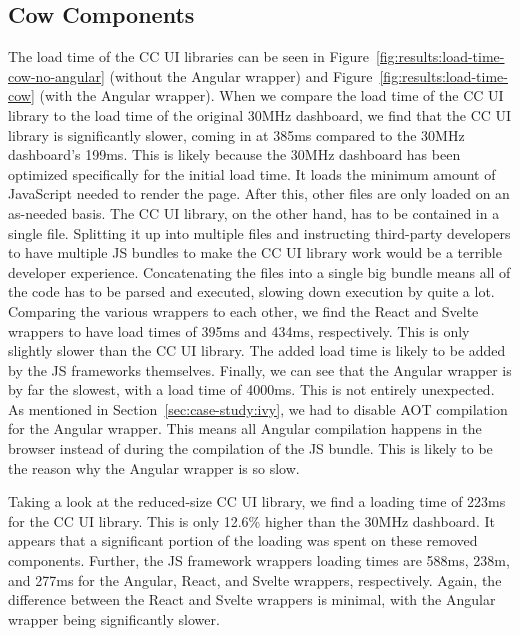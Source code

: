 \subsection{Cow Components}
The load time of the CC UI libraries can be seen in Figure~\ref{fig:results:load-time-cow-no-angular} (without the Angular wrapper) and Figure~\ref{fig:results:load-time-cow} (with the Angular wrapper). When we compare the load time of the CC UI library to the load time of the original 30MHz dashboard, we find that the CC UI library is significantly slower, coming in at 385ms compared to the 30MHz dashboard's 199ms. This is likely because the 30MHz dashboard has been optimized specifically for the initial load time. It loads the minimum amount of JavaScript needed to render the page. After this, other files are only loaded on an as-needed basis. The CC UI library, on the other hand, has to be contained in a single file. Splitting it up into multiple files and instructing third-party developers to have multiple JS bundles to make the CC UI library work would be a terrible developer experience. Concatenating the files into a single big bundle means all of the code has to be parsed and executed, slowing down execution by quite a lot.
Comparing the various wrappers to each other, we find the React and Svelte wrappers to have load times of 395ms and 434ms, respectively. This is only slightly slower than the CC UI library. The added load time is likely to be added by the JS frameworks themselves. Finally, we can see that the Angular wrapper is by far the slowest, with a load time of 4000ms. This is not entirely unexpected. As mentioned in Section~\ref{sec:case-study:ivy}, we had to disable AOT compilation for the Angular wrapper. This means all Angular compilation happens in the browser instead of during the compilation of the JS bundle. This is likely to be the reason why the Angular wrapper is so slow.

Taking a look at the reduced-size CC UI library, we find a loading time of 223ms for the CC UI library. This is only 12.6\% higher than the 30MHz dashboard. It appears that a significant portion of the loading was spent on these removed components. Further, the JS framework wrappers loading times are 588ms, 238m, and 277ms for the Angular, React, and Svelte wrappers, respectively. Again, the difference between the React and Svelte wrappers is minimal, with the Angular wrapper being significantly slower.

